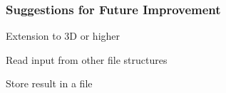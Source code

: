 \subsubsection*{Suggestions for Future Improvement}


\begin{DoxyItemize}
\item Extension to 3D or higher
\item Read input from other file structures
\item Store result in a file 
\end{DoxyItemize}